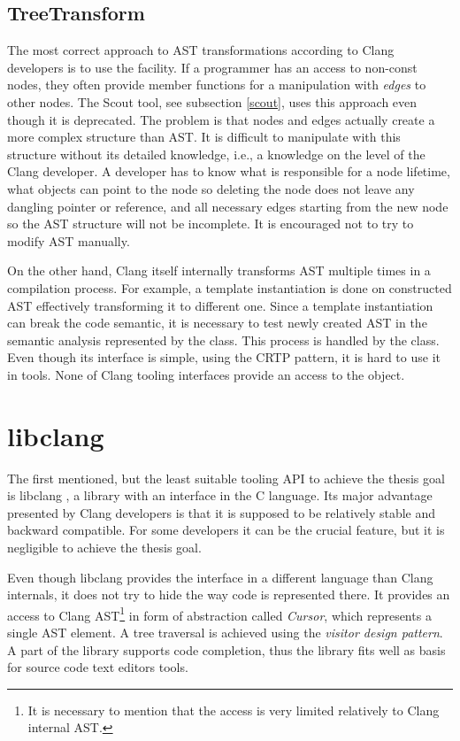 \subsection{TreeTransform}
The most correct approach to AST transformations according to Clang developers is to use the  facility. If a programmer has an access to non-const nodes, they often provide member functions for a manipulation with \textit{edges} to other nodes. The Scout tool, see subsection \ref{scout}, uses this approach even though it is deprecated. The problem is that nodes and edges actually create a more complex structure than AST. It is difficult to manipulate with this structure without its detailed knowledge, i.e., a knowledge on the level of the Clang developer. A developer has to know what is responsible for a node lifetime, what objects can point to the node so deleting the node does not leave any dangling pointer or reference, and all necessary edges starting from the new node so the AST structure will not be incomplete. It is encouraged not to try to modify AST manually.

On the other hand, Clang itself internally transforms AST multiple times in a compilation process. For example, a template instantiation is done on constructed AST effectively transforming it to different one. Since a template instantiation can break the code semantic, it is necessary to test newly created AST in the semantic analysis represented by the  class. This process is handled by the  class. Even though its interface is simple, using the CRTP pattern, it is hard to use it in tools. None of Clang tooling interfaces provide an access to the  object.

\section{libclang}
The first mentioned, but the least suitable tooling API to achieve the thesis goal is libclang \cite{clang-libclang}, a library with an interface in the C language. Its major advantage presented by Clang developers is that it is supposed to be relatively stable and backward compatible. For some developers it can be the crucial feature, but it is negligible to achieve the thesis goal.

Even though libclang provides the interface in a different language than Clang internals, it does not try to hide the way code is represented there. It provides an access to Clang AST\footnote{It is necessary to mention that the access is very limited relatively to Clang internal AST.} in form of abstraction called \emph{Cursor}, which represents a single AST element. A tree traversal is achieved using the \emph{visitor design pattern}. A part of the library supports code completion, thus the library fits well as basis for source code text editors tools.

